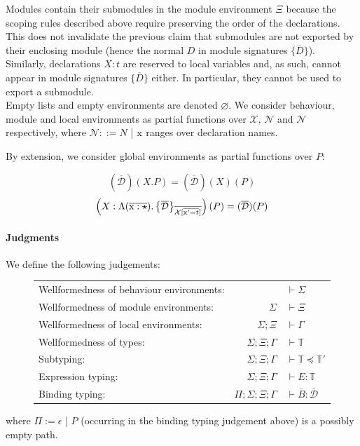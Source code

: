 \documentclass[12pt]{article}
\newcommand{\tx}{\text{\rm x}}
\newcommand{\BX}{\ensuremath{\mathcal{X}}}
\newcommand{\Next}{\ensuremath{\mathcal{N}}}
\newcommand{\emptyenv}{\varnothing}
\newcommand{\Gammatop}{\ensuremath{\Xi}}
\newcommand{\Gammabot}{\ensuremath{\Gamma}}
\begin{document}
Modules contain their submodules in the module environment $\Gammatop$
because the scoping rules described above require preserving the order
of the declarations. This does not invalidate the previous claim that
submodules are not exported by their enclosing module (hence the normal $D$
in module signatures $\{ \overline{D} \}$).
Similarly, declarations $X : t$ are reserved to local variables and, as such,
cannot appear in module signatures $\{ \overline{D} \}$ either.
In particular, they cannot be used to export a submodule. \\

Empty lists and empty environments are denoted $\emptyenv$. We consider behaviour, module and local
environments as partial functions over $\BX$, $\Next$ and $\Next$ respectively,
where $\Next ::= N$ | $\tx$ ranges over declaration names.

By extension, we consider global environments as partial functions over $P$:

$$
    (\overline{\mathcal{D}})(X.P) = (\overline{\mathcal{D}})(X)(P)
$$
$$
    \left(X : \Moddecl\right)(P) = (\overline{\mathcal{D}})(P)
$$

\paragraph{Judgments}

We define the following judgements:

\begin{figure}[H]
    \begin{center}
        \begin{tabular}{lrl}
            Wellformedness of behaviour environments: &                                     & $\vdash \Sigma$                                 \\[2mm]
            Wellformedness of module environments:    & $\Sigma$                            & $\vdash \Gammatop$                              \\[2mm]
            Wellformedness of local environments:     & $\Sigma; \Gammatop$                 & $\vdash \Gammabot$                              \\[2mm]
            Wellformedness of types:                  & $\Sigma; \Gammatop; \Gammabot$      & $\vdash \mathbb{T}$                             \\[2mm]
            Subtyping:                                & $\Sigma; \Gammatop; \Gammabot$      & $\vdash \mathbb{T} \preceq \mathbb{T}'$         \\[2mm]
            Expression typing:                        & $\Sigma; \Gammatop; \Gammabot$      & $\vdash E : \mathbb{T} $                        \\[2mm]
            Binding typing:                           & $\Pi; \Sigma; \Gammatop; \Gammabot$ & $\vdash \overline{B} : \overline{\mathcal{D}} $ \\[2mm]
        \end{tabular}
    \end{center}
\end{figure}
where $\Pi := \epsilon$ | $P$ (occurring in the binding typing judgement above) is a possibly empty path.
\end{document}
